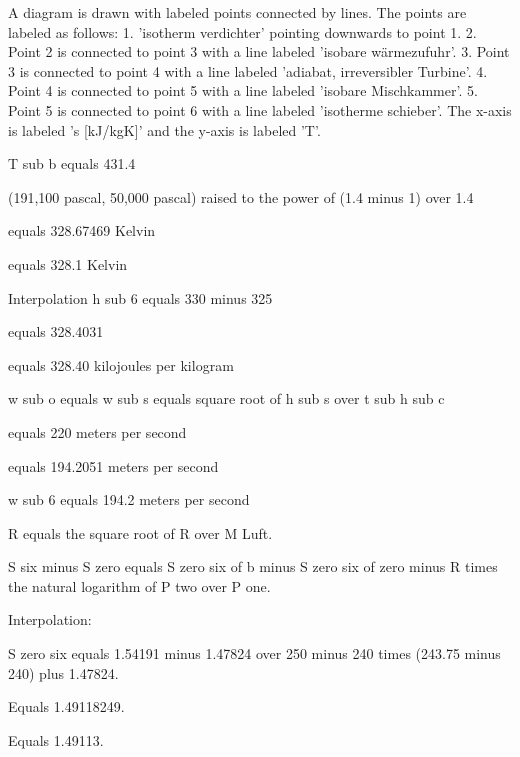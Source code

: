 A diagram is drawn with labeled points connected by lines. The points are labeled as follows:
1. 'isotherm verdichter' pointing downwards to point 1.
2. Point 2 is connected to point 3 with a line labeled 'isobare wärmezufuhr'.
3. Point 3 is connected to point 4 with a line labeled 'adiabat, irreversibler Turbine'.
4. Point 4 is connected to point 5 with a line labeled 'isobare Mischkammer'.
5. Point 5 is connected to point 6 with a line labeled 'isotherme schieber'.
The x-axis is labeled 's [kJ/kgK]' and the y-axis is labeled 'T'.

T sub b equals 431.4

(191,100 pascal, 50,000 pascal) raised to the power of (1.4 minus 1) over 1.4

equals 328.67469 Kelvin

equals 328.1 Kelvin

Interpolation h sub 6 equals 330 minus 325

equals 328.4031

equals 328.40 kilojoules per kilogram

w sub o equals w sub s equals square root of h sub s over t sub h sub c

equals 220 meters per second

equals 194.2051 meters per second

w sub 6 equals 194.2 meters per second

R equals the square root of R over M Luft.

S six minus S zero equals S zero six of b minus S zero six of zero minus R times the natural logarithm of P two over P one.

Interpolation:

S zero six equals 1.54191 minus 1.47824 over 250 minus 240 times (243.75 minus 240) plus 1.47824.

Equals 1.49118249.

Equals 1.49113.